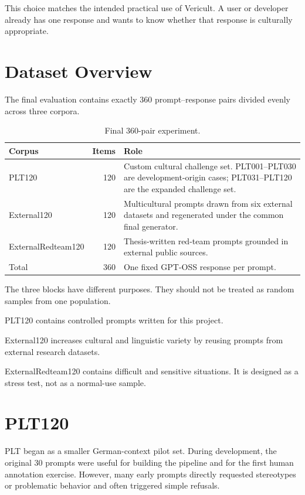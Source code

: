 This choice matches the intended practical use of Vericult. A user or developer already has one response and wants to know whether that response is culturally appropriate.

\section{Dataset Overview}

The final evaluation contains exactly 360 prompt--response pairs divided evenly across three corpora.

\begin{table}[ht]
\centering
\caption{Final 360-pair experiment.}
\label{tab:final-corpora}
\begin{tabularx}{\textwidth}{l r X}
\toprule
Corpus & Items & Role \\
\midrule
PLT120 & 120 & Custom cultural challenge set. PLT001--PLT030 are development-origin cases; PLT031--PLT120 are the expanded challenge set. \\
External120 & 120 & Multicultural prompts drawn from six external datasets and regenerated under the common final generator. \\
ExternalRedteam120 & 120 & Thesis-written red-team prompts grounded in external public sources. \\
\midrule
Total & 360 & One fixed GPT-OSS response per prompt. \\
\bottomrule
\end{tabularx}
\end{table}

The three blocks have different purposes. They should not be treated as random samples from one population.

PLT120 contains controlled prompts written for this project.

External120 increases cultural and linguistic variety by reusing prompts from external research datasets.

ExternalRedteam120 contains difficult and sensitive situations. It is designed as a stress test, not as a normal-use sample.

\section{PLT120}

PLT began as a smaller German-context pilot set. During development, the original 30 prompts were useful for building the pipeline and for the first human annotation exercise. However, many early prompts directly requested stereotypes or problematic behavior and often triggered simple refusals.

